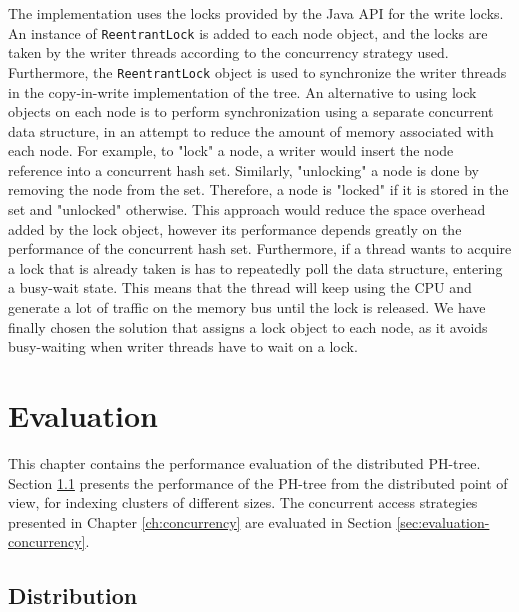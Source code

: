\documentclass[11pt,a4paper]{globis-book}
\begin{document}
The implementation uses the locks provided by the Java API for the write locks. An instance of \texttt{ReentrantLock} is added to each node object, and the locks are taken by the writer threads according to the concurrency strategy used. Furthermore, the \texttt{ReentrantLock} object is used to synchronize the writer threads in the copy-in-write implementation of the tree. An alternative to using lock objects on each node is to perform synchronization using a separate concurrent data structure, in an attempt to reduce the amount of memory associated with each node. For example, to "lock" a node, a writer would insert the node reference into a concurrent hash set. Similarly, "unlocking" a node is done by removing the node from the set. Therefore, a node is "locked" if it is stored in the set and "unlocked" otherwise. This approach would reduce the space overhead added by the lock object, however its performance depends greatly on the performance of the concurrent hash set. Furthermore, if a thread wants to acquire a lock that is already taken is has to repeatedly poll the data structure, entering a busy-wait state. This means that the thread will keep using the CPU and generate a lot of traffic on the memory bus until the lock is released. We have finally chosen the solution that assigns a lock object to each node, as it avoids busy-waiting when writer threads have to wait on a lock.  

\chapter{Evaluation}
\label{ch:evaluation}

This chapter contains the performance evaluation of the distributed PH-tree. Section \ref{sec:evalution-distribution} presents the performance of the PH-tree from the distributed point of view, for indexing clusters of different sizes. The concurrent access strategies presented in Chapter \ref{ch:concurrency} are evaluated in Section \ref{sec:evaluation-concurrency}.

\section{Distribution}
\label{sec:evalution-distribution}
\end{document}
